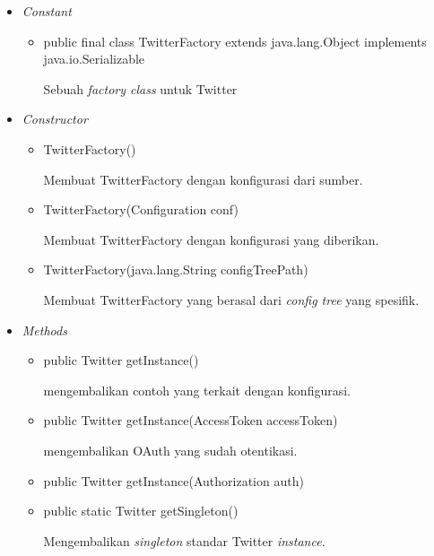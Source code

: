 	\begin{itemize}
		\item \textit{Constant}
		
		\begin{itemize}
			\item public final class TwitterFactory
			extends java.lang.Object
			implements java.io.Serializable
			
			Sebuah \textit{factory class} untuk Twitter
		\end{itemize}
		\item \textit{Constructor}
		
		\begin{itemize}
			\item TwitterFactory()
			
			Membuat TwitterFactory dengan konfigurasi dari sumber.
			\item TwitterFactory(Configuration conf)
			
			Membuat TwitterFactory dengan konfigurasi yang diberikan.
			\item TwitterFactory(java.lang.String configTreePath)
			
			Membuat TwitterFactory yang berasal dari \textit{config tree} yang spesifik.
		\end{itemize}
		\item \textit{Methods}
		
		\begin{itemize}
			\item public Twitter getInstance()
			
			mengembalikan contoh yang terkait dengan konfigurasi.
			\item public Twitter getInstance(AccessToken accessToken)
			
			mengembalikan OAuth yang sudah otentikasi.
			\item public Twitter getInstance(Authorization auth)
			\item public static Twitter getSingleton()
			
			Mengembalikan \textit{singleton} standar Twitter \textit{instance}.
		\end{itemize}
	\end{itemize}
	
	
